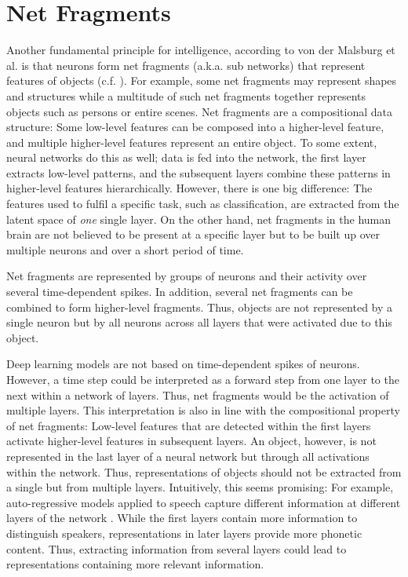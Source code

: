 \section{Net Fragments}
Another fundamental principle for intelligence, according to von der Malsburg et al.  is that neurons form net fragments (a.k.a. sub networks) that represent features of objects (c.f. ).
For example, some net fragments may represent shapes and structures while a multitude of such net fragments together represents objects such as persons or entire scenes.
Net fragments are a compositional data structure: Some low-level features can be composed into a higher-level feature, and multiple higher-level features represent an entire object.
To some extent, neural networks do this as well; data is fed into the network, the first layer extracts low-level patterns, and the subsequent layers combine these patterns in higher-level features hierarchically.
However, there is one big difference: The features used to fulfil a specific task, such as classification, are extracted from the latent space of \emph{one} single layer.
On the other hand, net fragments in the human brain are not believed to be present at a specific layer but to be built up over multiple neurons and over a short period of time.

\begin{claim}
	Net fragments are represented by groups of neurons and their activity over several time-dependent spikes. In addition, several net fragments can be combined to form higher-level fragments. Thus, objects are not represented by a single neuron but by all neurons across all layers that were activated due to this object.
\end{claim}

Deep learning models are not based on time-dependent spikes of neurons.
However, a time step could be interpreted as a forward step from one layer to the next within a network of layers.
Thus, net fragments would be the activation of multiple layers.
This interpretation is also in line with the compositional property of net fragments:
Low-level features that are detected within the first layers activate higher-level features in subsequent layers.
An object, however, is not represented in the last layer of a neural network but through all activations within the network.
Thus, representations of objects should not be extracted from a single but from multiple layers.
Intuitively, this seems promising:
For example, auto-regressive models applied to speech capture different information at different layers of the network .
While the first layers contain more information to distinguish speakers, representations in later layers provide more phonetic content.
Thus, extracting information from several layers could lead to representations containing more relevant information.

